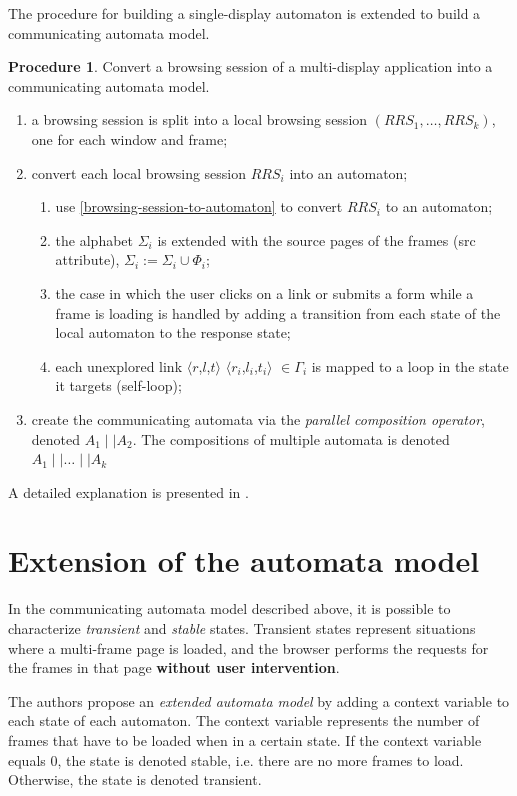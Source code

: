 \documentclass[a4paper,10pt]{article}
\newcommand{\reqmulti}[1][]{
  \ifthenelse{\equal{#1}{}} {\mbox{$\langle r$,$l$,$t\rangle$}}
  {\mbox{$\langle r_{#1}$,$l_{#1}$,$t_{#1}\rangle$}}
}
\theoremstyle{plain} %
\theoremstyle{definition}
\newtheorem{procedure}{Procedure}
\theoremstyle{remark}
\begin{document}
The procedure for building a single-display automaton is extended to build a communicating automata model.

\begin{procedure}
  Convert a browsing session of a multi-display application into a communicating automata model.

  \begin{enumerate}
    \item a browsing session is split into a local browsing session $(RRS_1,\dots,RRS_k)$, one for each window and frame;
    \item convert each local browsing session $RRS_i$ into an automaton;
      \begin{enumerate}
        \item use \cref{browsing-session-to-automaton} to convert $RRS_i$ to an automaton;
        \item the alphabet $\Sigma_i$ is extended with the source pages of the frames (src attribute), $\Sigma_i := \Sigma_i\cup\Phi_i$;
        \item the case in which the user clicks on a link or submits a form while a frame is loading is handled by adding a transition from each state of the local automaton to the response state;
        \item each unexplored link \reqmulti[i]$\in\Gamma_i$ is mapped to a loop in the state it targets (self-loop);
      \end{enumerate}
    \item create the communicating automata via the \textit{parallel composition operator}, denoted $A_1\mid\mid A_2$. The compositions of multiple automata is denoted $A_1\mid\mid\dots\mid\mid A_k$
  \end{enumerate}
\end{procedure}

A detailed explanation is presented in \cite{Haydar2004}.

\section{Extension of the automata model}

In the communicating automata model described above, it is possible to characterize \textit{transient} and \textit{stable} states. Transient states represent situations where a multi-frame page is loaded, and the browser performs the requests for the frames in that page \textbf{without user intervention}.

The authors propose an \textit{extended automata model} by adding a context variable to each state of each automaton. The context variable represents the number of frames that have to be loaded when in a certain state. If the context variable equals 0, the state is denoted stable, i.e. there are no more frames to load. Otherwise, the state is denoted transient.
\end{document}

